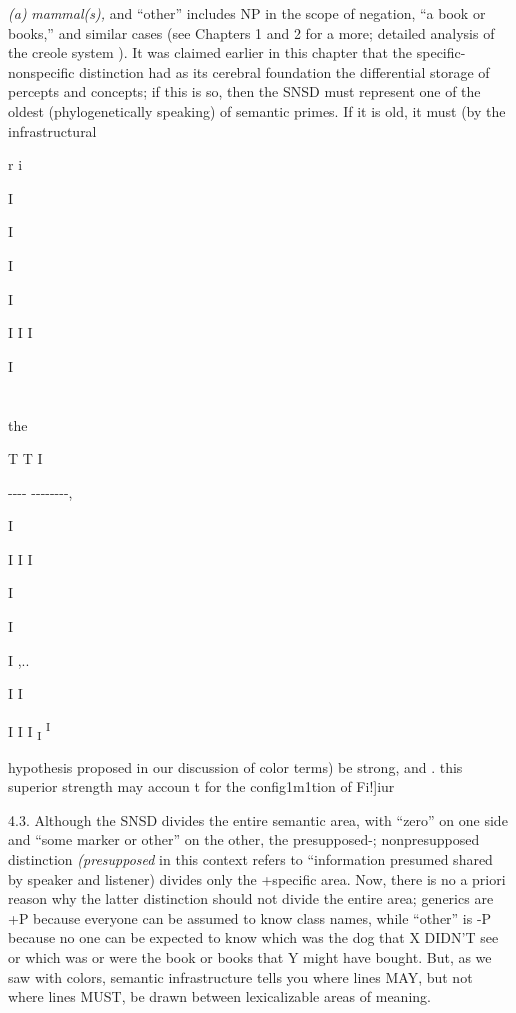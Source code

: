 \textit{(a)} \textit{mammal(s), }and ``other'' includes NP in the scope of negation, ``a book or books,'' and similar cases (see Chapters 1 and 2 for a more; detailed analysis of the creole system ). It was claimed earlier in this chapter that the specific-nonspecific distinction had as its cerebral foundation the differential storage of percepts and concepts; if this is so, then the SNSD must represent one of the oldest (phylogenetically
speaking) of semantic primes. If it is old, it must (by the infrastructural

r i

I

I

I

I

I I I

I

\section{}
the

T T I

{}-{}-{}-{}- {}-{}-{}-{}-{}-{}-{}-{}-,

I 

I I I

I

I

I ,..

I I

I I I \textsubscript{I }\textsuperscript{I} 

hypothesis proposed in our discussion of color terms) be strong, and . this superior strength may accoun t for the config1m1tion of Fi!]iur

4.3. Although the SNSD divides the entire semantic area, with ``zero'' on one side and ``some marker or other'' on the other, the presupposed-; nonpresupposed distinction \textit{(presupposed} in this context refers to ``information presumed shared by speaker and listener{\textquotedbl}) divides only the +specific area. Now, there is no a priori reason why the latter distinction should not divide the entire area; generics are +P because everyone can be assumed to know class names, while ``other'' is {}-P because no one can be expected to know which was the dog that X DIDN'T see or which was or were the book or books that Y might have bought. But, as we saw with colors, semantic infrastructure tells you where lines MAY, but not where lines MUST, be drawn between lexicalizable areas of meaning.

